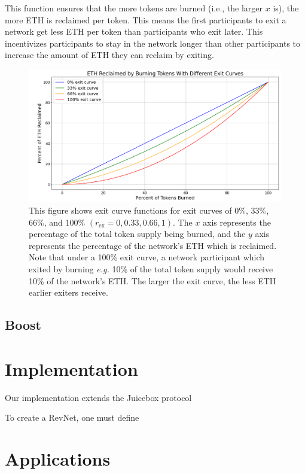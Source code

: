 \documentclass{article}
\begin{document}
This function ensures that the more tokens are burned (i.e., the larger $x$ is), the more ETH is reclaimed per token. This means the first participants to exit a network get less ETH per token than participants who exit later. This incentivizes participants to stay in the network longer than other participants to increase the amount of ETH they can reclaim by exiting.

\begin{figure}[ht]
  \centering
  \includegraphics[width=\textwidth]{figures/multi-exit-curves.png}
  \caption{This figure shows exit curve functions for exit curves of 0\%, 33\%, 66\%, and 100\% $(r_{\text{ex}} = 0, 0.33, 0.66, 1)$. The $x$ axis represents the percentage of the total token supply being burned, and the $y$ axis represents the percentage of the network's ETH which is reclaimed. Note that under a 100\% exit curve, a network participant which exited by burning \textit{e.g.} 10\% of the total token supply would receive 10\% of the network's ETH. The larger the exit curve, the less ETH earlier exiters receive.}
\end{figure}

\subsection{Boost}

\section{Implementation}

Our implementation extends the Juicebox protocol

To create a RevNet, one must define

\section{Applications}
\end{document}
